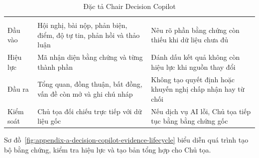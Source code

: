 \begin{longtable}{|T{0.14\textwidth}|T{0.35\textwidth}|T{0.41\textwidth}|}
\caption{Đặc tả Chair Decision Copilot}\label{tab:appendix-a-decision-copilot}\\
\hline
{} &  &  \\ \hline
\endfirsthead
\hline
{} &  &  \\ \hline
\endhead
Đầu vào & Hội nghị, bài nộp, phản biện, điểm, độ tự tin, phản hồi và thảo luận & Nêu rõ phần bằng chứng còn thiếu khi dữ liệu chưa đủ \\ \hline
Hiệu lực & Mã nhận diện bằng chứng và từng thành phần & Đánh dấu kết quả không còn hiệu lực khi nguồn thay đổi \\ \hline
Đầu ra & Tổng quan, đồng thuận, bất đồng, vấn đề còn mở và ghi chú nháp & Không tạo quyết định hoặc khuyến nghị chấp nhận hay từ chối \\ \hline
Kiểm soát & Chủ tọa đối chiếu trực tiếp với dữ liệu gốc & Nếu dịch vụ AI lỗi, Chủ tọa tiếp tục bằng bằng chứng gốc \\ \hline
\end{longtable}

Sơ đồ~\ref{fig:appendix-a-decision-copilot-evidence-lifecycle} biểu diễn quá trình tạo bộ bằng chứng, kiểm tra hiệu lực và tạo bản tổng hợp cho Chủ tọa.

